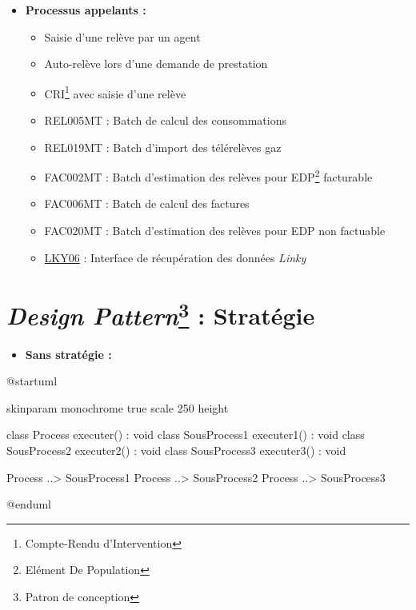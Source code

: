 \documentclass[a4paper, 12pt]{report}
\begin{document}
\begin{itemize}
  \item \textbf{Processus appelants :}\\
  \begin{itemize}
    \item Saisie d'une relève par un agent
    \item Auto-relève lors d'une demande de prestation
    \item CRI\footnote{Compte-Rendu d'Intervention} avec saisie d'une relève
    \item REL005MT : Batch de calcul des consommations
    \item REL019MT : Batch d'import des télérelèves gaz
    \item FAC002MT : Batch d'estimation des relèves pour EDP\footnote{Elément De Population} facturable
    \item FAC006MT : Batch de calcul des factures
    \item FAC020MT : Batch d'estimation des relèves pour EDP non factuable
    \item \underline{LKY06} : Interface de récupération des données \textit{Linky}
  \end{itemize}
\end{itemize}

\chapter{\textit{Design Pattern}\footnote{Patron de conception} : Stratégie}
\label{appendix:strategy}

\begin{itemize}
  \item \textbf{Sans stratégie :}\\
\end{itemize}

\begin{center}
  \begin{plantuml}
    @startuml

    skinparam monochrome true
    scale 250 height

    class Process {
      executer() : void
    }
    class SousProcess1 {
      executer1() : void
    }
    class SousProcess2 {
      executer2() : void
    }
    class SousProcess3 {
      executer3() : void
    }

    Process ..> SousProcess1
    Process ..> SousProcess2
    Process ..> SousProcess3

    @enduml
  \end{plantuml}
\end{center}
\vspace{0.5cm}
\end{document}
